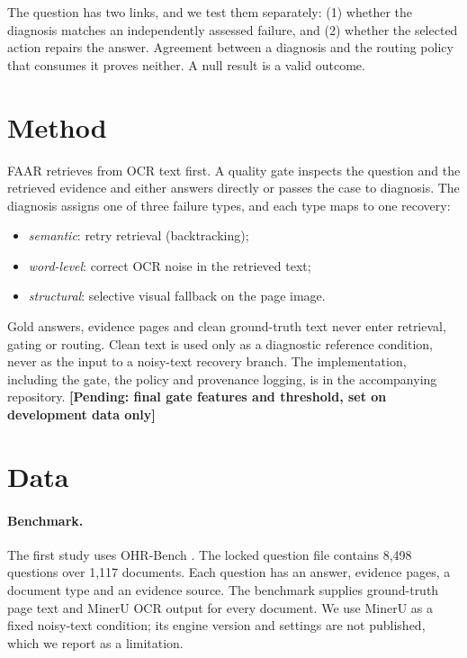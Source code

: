 \documentclass[10pt]{article}
\newcommand{\pending}[1]{\textbf{[Pending: #1]}}
\begin{document}
The question has two links, and we test them separately: (1) whether the diagnosis matches an independently assessed failure, and (2) whether the selected action repairs the answer. Agreement between a diagnosis and the routing policy that consumes it proves neither. A null result is a valid outcome.

\section{Method}

FAAR retrieves from OCR text first. A quality gate inspects the question and the retrieved evidence and either answers directly or passes the case to diagnosis. The diagnosis assigns one of three failure types, and each type maps to one recovery:

\begin{itemize}
  \item \emph{semantic}: retry retrieval (backtracking);
  \item \emph{word-level}: correct OCR noise in the retrieved text;
  \item \emph{structural}: selective visual fallback on the page image.
\end{itemize}

Gold answers, evidence pages and clean ground-truth text never enter retrieval, gating or routing. Clean text is used only as a diagnostic reference condition, never as the input to a noisy-text recovery branch. The implementation, including the gate, the policy and provenance logging, is in the accompanying repository. \pending{final gate features and threshold, set on development data only}

\section{Data}

\paragraph{Benchmark.} The first study uses OHR-Bench \citep{zhang2025ocrhinders}. The locked question file contains 8,498 questions over 1,117 documents. Each question has an answer, evidence pages, a document type and an evidence source. The benchmark supplies ground-truth page text and MinerU OCR output for every document. We use MinerU as a fixed noisy-text condition; its engine version and settings are not published, which we report as a limitation.
\end{document}
